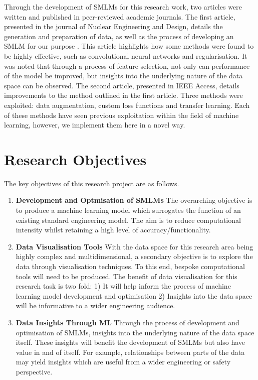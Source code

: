 \noindent
Through the development of SMLMs for this research work, two articles were written and published in peer-reviewed academic journals. The first article, presented in the journal of Nuclear Engineering and Design, details the generation and preparation of data, as well as the process of developing an SMLM for our purpose \cite{jones2022surrogate}. This article highlights how some methods were found to be highly effective, such as convolutional neural networks and regularisation. It was noted that through a process of feature selection, not only can performance of the model be improved, but insights into the underlying nature of the data space can be observed. The second article, presented in IEEE Access, details improvements to the method outlined in the first article. Three methods were exploited: data augmentation, custom loss functions and transfer learning. Each of these methods have seen previous exploitation within the field of machine learning, however, we implement them here in a novel way. 


\section{Research Objectives}

The key objectives of this research project are as follows.

\begin{enumerate}
	\item \textbf{Development and Optmisation of SMLMs} The overarching objective is to produce a machine learning model which surrogates the function of an existing standard engineering model. The aim is to reduce computational intensity whilst retaining a high level of accuracy/functionality. 
	
	\item \textbf{Data Visualisation Tools} With the data space for this research area being highly complex and multidimensional, a secondary objective is to explore the data through visualisation techniques. To this end, bespoke computational tools will need to be produced. The benefit of data visualisation for this research task is two fold: 1) It will help inform the process of machine learning model development and optimisation 2) Insights into the data space will be informative to a wider engineering audience.
	
	\item \textbf{Data Insights Through ML} Through the process of development and optimisation of SMLMs, insights into the underlying nature of the data space itself. These insights will benefit the development of SMLMs but also have value in and of itself. For example, relationships between parts of the data may yield insights which are useful from a wider engineering or safety perspective. 
	
	
\end{enumerate}



